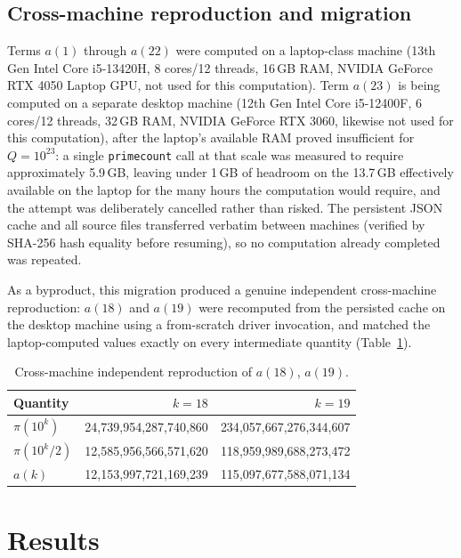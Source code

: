 \documentclass[11pt]{amsart}
\newcommand{\pcount}{\pi}
\begin{document}
\subsection{Cross-machine reproduction and migration}
\label{sec:hardware}

Terms $a(1)$ through $a(22)$ were computed on a laptop-class machine (13th
Gen Intel Core i5-13420H, 8 cores/12 threads, 16\,GB RAM, NVIDIA GeForce
RTX 4050 Laptop GPU, not used for this computation). Term $a(23)$ is being
computed on a separate desktop machine (12th Gen Intel Core i5-12400F, 6
cores/12 threads, 32\,GB RAM, NVIDIA GeForce RTX 3060, likewise not used
for this computation), after the laptop's available RAM proved
insufficient for $Q=10^{23}$: a single \texttt{primecount} call at that
scale was measured to require approximately 5.9\,GB, leaving under 1\,GB
of headroom on the 13.7\,GB effectively available on the laptop for the
many hours the computation would require, and the attempt was
deliberately cancelled rather than risked. The persistent JSON cache and
all source files transferred verbatim between machines (verified by
SHA-256 hash equality before resuming), so no computation already
completed was repeated.

As a byproduct, this migration produced a genuine independent
cross-machine reproduction: $a(18)$ and $a(19)$ were recomputed from the
persisted cache on the desktop machine using a from-scratch driver
invocation, and matched the laptop-computed values exactly on every
intermediate quantity (Table~\ref{tab:crossmachine}).

\begin{table}[h]
\centering
\caption{Cross-machine independent reproduction of $a(18)$, $a(19)$.}
\label{tab:crossmachine}
\begin{tabular}{lrr}
\toprule
Quantity & $k=18$ & $k=19$ \\
\midrule
$\pcount(10^k)$ & 24{,}739{,}954{,}287{,}740{,}860 & 234{,}057{,}667{,}276{,}344{,}607 \\
$\pcount(10^k/2)$ & 12{,}585{,}956{,}566{,}571{,}620 & 118{,}959{,}989{,}688{,}273{,}472 \\
$a(k)$ & 12{,}153{,}997{,}721{,}169{,}239 & 115{,}097{,}677{,}588{,}071{,}134 \\
\bottomrule
\end{tabular}
\end{table}

\section{Results}
\label{sec:results}
\end{document}
